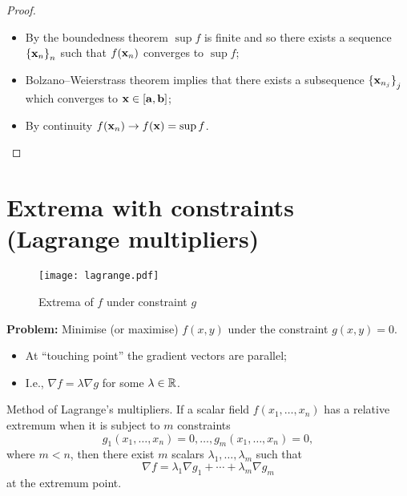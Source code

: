 \begin{proof}
    \begin{itemize}
        \item  By the boundedness theorem \(\sup f\) is finite and so there exists a sequence  \({\{\mathbf{x}_{n}\}}_{n}\)  such that \(f(\mathbf{x}_n)\) converges to \(\sup f\);
        \item Bolzano–Weierstrass theorem implies that there exists a subsequence  \({\{\mathbf{x}_{n_j}\}}_{j}\) which converges to \( \mathbf{x} \in [\mathbf{a},\mathbf{b}]\);
        \item By continuity \(f(\mathbf{x}_n) \to f(\mathbf{x}) = \sup f\).
    \end{itemize}
\end{proof}




\section{Extrema with constraints (Lagrange multipliers)}

\begin{figure}
    \begin{center}
        \texttt{[image: lagrange.pdf]}
        \caption{Extrema of \(f\) under constraint \(g\)}
    \end{center}
\end{figure}


\textbf{Problem:}
Minimise (or maximise) \(f(x,y)\) under the constraint \(g(x,y) = 0\).
\begin{itemize}
    \item At ``touching point'' the gradient vectors are parallel;
    \item I.e., \(\nabla f = \lambda \nabla g\) for some \(\lambda \in \mathbb{R}\).
\end{itemize}



{Method of Lagrange's multipliers}.
If a scalar field \(f(x_1,\ldots,x_n)\) has a relative extremum when it is subject to \(m\) constraints
\[
    g_1(x_1,\ldots,x_n) = 0,
    \dots , g_m(x_1,\ldots,x_n)=0,
\]
where \(m<n\), then there exist \(m\) scalars \(\lambda_1,\ldots,\lambda_m\) such that
\[
    \nabla f = \lambda_1 \nabla g_1 + \cdots + \lambda_m \nabla g_m
\]
at the extremum point.



